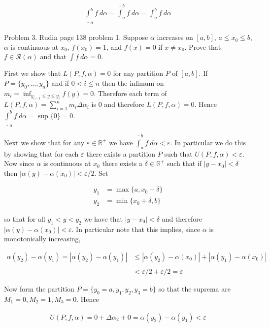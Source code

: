 \documentclass{article}
\begin{document}
  \begin{align*}
    \underline \int_a^b f\ d\alpha = \overline \int_a^b f \ d\alpha = \int_a^b f \ d\alpha
  \end{align*}

  \pagebreak
  {\Large \color{Sepia} Problem 3. Rudin page 138 problem 1. Suppose $\alpha$ increases on $[a,b]$, $a\leq x_0\leq b$, $\alpha$ is continuous at $x_0$, $f(x_0)=1$, and $f(x)=0$ if $x\ne x_0$.  Prove that $f\in\mathscr R(\alpha)$ and that $\int f \ d\alpha=0$.  }

  \vspace{1cm}

  First we show that $L(P,f,\alpha)=0$ for any partition $P$ of $[a,b]$.  If $P=\{y_0,\dots,y_n\}$ and if $0 < i \leq n$ then the infimum on $\displaystyle m_i=\inf_{y_{i-1}\leq y \leq y_i}f(y) = 0$.  Therefore each term of $L(P,f,\alpha)=\displaystyle\sum_{i=1}^n m_i\Delta\alpha_i$ is 0 and therefore $L(P,f,\alpha)=0$.  Hence $\underline\int_a^b f \ d\alpha = \sup\{0\}=0$.

  Next we show that for any $\varepsilon\in\mathbb R^+$ we have $\overline\int_a^b f \ d\alpha < \varepsilon$.  In particular we do this by showing that for each $\varepsilon$ there exists a partition $P$ such that $U(P,f,\alpha)<\varepsilon$.  Now since $\alpha$ is continuous at $x_0$ there exists a $\delta\in\mathbb R^+$ such that if $|y-x_0|<\delta$ then $|\alpha(y)-\alpha(x_0)|<\varepsilon/2$.  Set

  \begin{align*}
    y_1 &= \max\{a, x_0-\delta\}\\
    y_2 &= \min\{x_0+\delta, b\}
  \end{align*}

  so that for all $y_1<y<y_2$ we have that $|y-x_0|<\delta$ and therefore $|\alpha(y)-\alpha(x_0)|<\varepsilon$.  In particular note that this implies, since $\alpha$ is monotonically increasing,

  \begin{align*}
    \alpha(y_2)-\alpha(y_1) = |\alpha(y_2)-\alpha(y_1)| &\leq |\alpha(y_2)-\alpha(x_0)|+|\alpha(y_1)-\alpha(x_0)| \\\\
    &< \varepsilon/2 +\varepsilon/2 = \varepsilon
  \end{align*}

  Now form the partition $P=\{y_0=a,y_1,y_2,y_3=b\}$ so that the suprema are $M_1=0,M_2=1,M_3=0$.  Hence

  \begin{align*}
    U(P,f,\alpha) = 0+\Delta\alpha_2+0=\alpha(y_2)-\alpha(y_1)<\varepsilon
  \end{align*}
\end{document}
